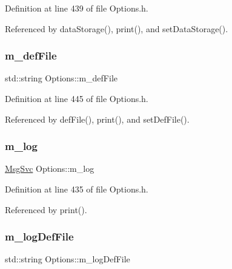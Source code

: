 Definition at line 439 of file Options.\+h.



Referenced by data\+Storage(), print(), and set\+Data\+Storage().

\mbox{\label{classOptions_a59ff5f2cab2490fb529367de13a2321a}} 
\subsubsection{\texorpdfstring{m\+\_\+def\+File}{m\_defFile}}
{\footnotesize\ttfamily std\+::string Options\+::m\+\_\+def\+File\hspace{0.3cm}{\ttfamily [private]}}



Definition at line 445 of file Options.\+h.



Referenced by def\+File(), print(), and set\+Def\+File().

\mbox{\label{classOptions_a80d2caed71dd935c104f0133504251e9}} 
\subsubsection{\texorpdfstring{m\+\_\+log}{m\_log}}
{\footnotesize\ttfamily \hyperlink{classMsgSvc}{Msg\+Svc} Options\+::m\+\_\+log\hspace{0.3cm}{\ttfamily [private]}}



Definition at line 435 of file Options.\+h.



Referenced by print().

\mbox{\label{classOptions_abaef6cdcc8422b199084510d173edbe6}} 
\subsubsection{\texorpdfstring{m\+\_\+log\+Def\+File}{m\_logDefFile}}
{\footnotesize\ttfamily std\+::string Options\+::m\+\_\+log\+Def\+File\hspace{0.3cm}{\ttfamily [private]}}



